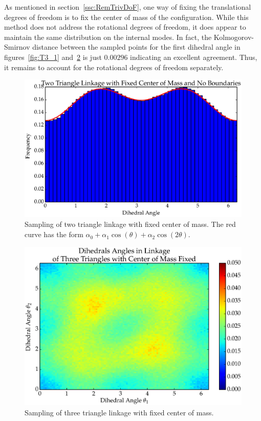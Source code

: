 As mentioned in section~\ref{ssc:RemTrivDoF}, one way of fixing the translational degrees of freedom is to fix the center of mass of the configuration. While this method does not address the rotational degrees of freedom, it does appear to maintain the same distribution on the internal modes. In fact, the Kolmogorov-Smirnov distance between the sampled points for the first dihedral angle in figures~\ref{fig:T3_1} and~\ref{fig:T3_5} is just $0.00296$ indicating an excellent agreement. Thus, it remains to account for the rotational degrees of freedom separately.  
\begin{figure}[ht]
\centering
  \includegraphics[scale=0.6]{images/T2_4.eps}
\caption{Sampling of two triangle linkage with fixed center of mass. The red curve has the form $\alpha_0 + \alpha_1\cos(\theta) + \alpha_2\cos(2\theta)$.}
\label{fig:T2_4}
\end{figure}

\begin{figure}[ht]
\centering
  \includegraphics[scale=0.6]{images/T3_5_2D.eps}
\caption{Sampling of three triangle linkage with fixed center of mass.}
\label{fig:T3_5}
\end{figure}


